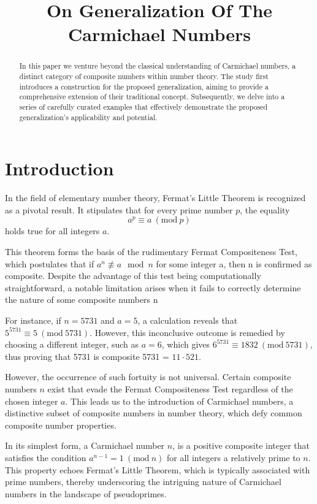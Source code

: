 \documentclass{article}
\date{}
\author{}
\title{On Generalization Of The Carmichael Numbers}
\theoremstyle{definition}
\theoremstyle{definition}
\begin{document}
\maketitle
\begin{abstract}
In this paper we venture beyond the classical understanding of Carmichael numbers, a distinct category of composite numbers within number theory. The study first introduces a construction for the proposed generalization, aiming to provide a comprehensive extension of their traditional concept. Subsequently, we delve into a series of carefully curated examples that effectively demonstrate the proposed generalization's applicability and potential.
\end{abstract}

\section{Introduction}
In the field of elementary number theory, Fermat’s Little Theorem is recognized as a pivotal result. It stipulates that for every prime number $p$, the equality $$a^p \equiv a \ (\textrm{mod}\ p)$$ holds true for all integers $a$.

This theorem forms the basis of the rudimentary Fermat Compositeness Test, which postulates that if $a^n \not\equiv a \mod n$ for some integer a, then n is confirmed as composite. Despite the advantage of this test being computationally straightforward, a notable limitation arises when it fails to correctly determine the nature of some composite numbers n 

For instance, if $n = 5731$ and $a = 5$, a calculation reveals that $5^{5731} \equiv 5 \ (\textrm{mod}\ 5731)$. However, this inconclusive outcome is remedied by choosing a different integer, such as $a = 6$, which gives $6^{5731} \equiv 1832 \ (\textrm{mod}\ 5731)$, thus
proving that 5731 is composite 5731 = $11 \cdot 521$. 

However, the occurrence of such fortuity is not universal. Certain composite numbers $n$ exist that evade the Fermat Compositeness Test regardless of the chosen integer $a.$ This leads us to the introduction of Carmichael numbers, a distinctive subset of composite numbers in number theory, which defy common composite number properties.

In its simplest form, a Carmichael number $n$, is a positive composite integer that satisfies the condition $a^{n-1} = 1\ (\textrm{mod}\ n)$ for all integers a relatively prime to $n.$ This property echoes Fermat's Little Theorem, which is typically associated with prime numbers, thereby underscoring the intriguing nature of Carmichael numbers in the landscape of pseudoprimes.
\end{document}
